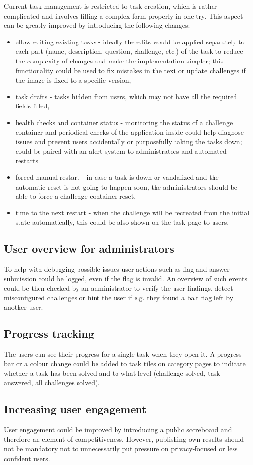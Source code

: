 Current task management is restricted to task creation, which is rather complicated and involves filling a complex form properly in one try. This aspect can be greatly improved by introducing the following changes:
\begin{itemize}
	\item allow editing existing tasks - ideally the edits would be applied separately to each part (name, description, question, challenge, etc.) of the task to reduce the complexity of changes and make the implementation simpler; this functionality could be used to fix mistakes in the text or update challenges if the image is fixed to a specific version,
	\item task drafts - tasks hidden from users, which may not have all the required fields filled,
	\item health checks and container status - monitoring the status of a challenge container and periodical checks of the application inside could help diagnose issues and prevent users accidentally or purposefully taking the tasks down; could be paired with an alert system to administrators and automated restarts,
	\item forced manual restart - in case a task is down or vandalized and the automatic reset is not going to happen soon, the administrators should be able to force a challenge container reset,
	\item time to the next restart - when the challenge will be recreated from the initial state automatically, this could be also shown on the task page to users.
\end{itemize}

\subsection{User overview for administrators}

To help with debugging possible issues user actions such as flag and answer submission could be logged, even if the flag is invalid. An overview of such events could be then checked by an administrator to verify the user findings, detect misconfigured challenges or hint the user if e.g. they found a bait flag left by another user.

\subsection{Progress tracking}

The users can see their progress for a single task when they open it. A progress bar or a colour change could be added to task tiles on category pages to indicate whether a task has been solved and to what level (challenge solved, task answered, all challenges solved).

\subsection{Increasing user engagement}

User engagement could be improved by introducing a public scoreboard and therefore an element of competitiveness. However, publishing own results should not be mandatory not to unnecessarily put pressure on privacy-focused or less confident users.
